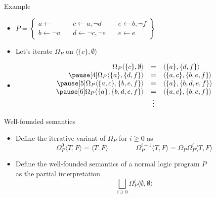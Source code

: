 \begin{frame}{Example}
  \bigskip
  \begin{itemize}
  \item<1->
    \(
    P
    =
    \left\{
      \begin{array}{lll}
        a \leftarrow                \quad &
        c \leftarrow a, \neg d      \quad &
        e \leftarrow b, \neg f
        \\
        b \leftarrow \neg a         \quad &
        d \leftarrow \neg c, \neg e \quad &
        e \leftarrow e
      \end{array}
    \right\}
    \)
    \bigskip
  \item<2-> Let's iterate $\Omega_P$ on $\langle \{c\}, \emptyset\rangle$
  \item<3-> []
    \[
    \begin{array}{rcl}
      \Omega_P\langle\{  c\},\emptyset  \rangle &=&\langle\{a  \},\{d,    f\}\rangle
      \\\pause[4]
      \Omega_P\langle\{a  \},\{  d,  f\}\rangle &=&\langle\{a,c\},\{b,  e,f\}\rangle
      \\\pause[5]
      \Omega_P\langle\{a,c\},\{b,  e,f\}\rangle &=&\langle\{a  \},\{b,d,e,f\}\rangle
      \\\pause[6]
      \Omega_P\langle\{a  \},\{b,d,e,f\}\rangle &=&\langle\{a,c\},\{b,  e,f\}\rangle
      \\
      & \vdots &
    \end{array}
    \]
  \end{itemize}
\end{frame}
\begin{frame}{Well-founded semantics}
  \bigskip
  \begin{itemize}
  \item<1-> Define the iterative variant of $\Omega_P$ for $i\geq 0$ as
    \[
    \Omega_P^0\langle T, F \rangle = \langle T, F \rangle
    \qquad\qquad
    \Omega_P^{i+1}\langle T, F \rangle =
    \Omega_P\Omega_P^i\langle T, F \rangle
    \]
  \item<2-> Define the \alert{well-founded semantics} of a normal logic program $P$\\
    as the partial interpretation
    \[
    \textstyle{\bigsqcup_{i \geq 0}} \Omega_P^i \langle \emptyset, \emptyset \rangle
    \]
  \end{itemize}
  \nocite{gerosc91a}
\end{frame}
